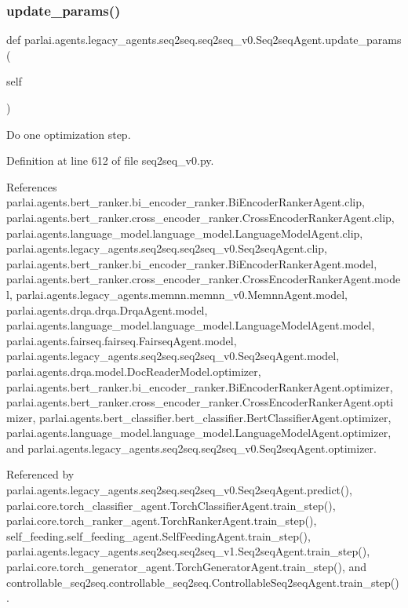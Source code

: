 \subsubsection{\texorpdfstring{update\+\_\+params()}{update\_params()}}
{\footnotesize\ttfamily def parlai.\+agents.\+legacy\+\_\+agents.\+seq2seq.\+seq2seq\+\_\+v0.\+Seq2seq\+Agent.\+update\+\_\+params (\begin{DoxyParamCaption}\item[{}]{self }\end{DoxyParamCaption})}

\begin{DoxyVerb}Do one optimization step.\end{DoxyVerb}
 

Definition at line 612 of file seq2seq\+\_\+v0.\+py.



References parlai.\+agents.\+bert\+\_\+ranker.\+bi\+\_\+encoder\+\_\+ranker.\+Bi\+Encoder\+Ranker\+Agent.\+clip, parlai.\+agents.\+bert\+\_\+ranker.\+cross\+\_\+encoder\+\_\+ranker.\+Cross\+Encoder\+Ranker\+Agent.\+clip, parlai.\+agents.\+language\+\_\+model.\+language\+\_\+model.\+Language\+Model\+Agent.\+clip, parlai.\+agents.\+legacy\+\_\+agents.\+seq2seq.\+seq2seq\+\_\+v0.\+Seq2seq\+Agent.\+clip, parlai.\+agents.\+bert\+\_\+ranker.\+bi\+\_\+encoder\+\_\+ranker.\+Bi\+Encoder\+Ranker\+Agent.\+model, parlai.\+agents.\+bert\+\_\+ranker.\+cross\+\_\+encoder\+\_\+ranker.\+Cross\+Encoder\+Ranker\+Agent.\+model, parlai.\+agents.\+legacy\+\_\+agents.\+memnn.\+memnn\+\_\+v0.\+Memnn\+Agent.\+model, parlai.\+agents.\+drqa.\+drqa.\+Drqa\+Agent.\+model, parlai.\+agents.\+language\+\_\+model.\+language\+\_\+model.\+Language\+Model\+Agent.\+model, parlai.\+agents.\+fairseq.\+fairseq.\+Fairseq\+Agent.\+model, parlai.\+agents.\+legacy\+\_\+agents.\+seq2seq.\+seq2seq\+\_\+v0.\+Seq2seq\+Agent.\+model, parlai.\+agents.\+drqa.\+model.\+Doc\+Reader\+Model.\+optimizer, parlai.\+agents.\+bert\+\_\+ranker.\+bi\+\_\+encoder\+\_\+ranker.\+Bi\+Encoder\+Ranker\+Agent.\+optimizer, parlai.\+agents.\+bert\+\_\+ranker.\+cross\+\_\+encoder\+\_\+ranker.\+Cross\+Encoder\+Ranker\+Agent.\+optimizer, parlai.\+agents.\+bert\+\_\+classifier.\+bert\+\_\+classifier.\+Bert\+Classifier\+Agent.\+optimizer, parlai.\+agents.\+language\+\_\+model.\+language\+\_\+model.\+Language\+Model\+Agent.\+optimizer, and parlai.\+agents.\+legacy\+\_\+agents.\+seq2seq.\+seq2seq\+\_\+v0.\+Seq2seq\+Agent.\+optimizer.



Referenced by parlai.\+agents.\+legacy\+\_\+agents.\+seq2seq.\+seq2seq\+\_\+v0.\+Seq2seq\+Agent.\+predict(), parlai.\+core.\+torch\+\_\+classifier\+\_\+agent.\+Torch\+Classifier\+Agent.\+train\+\_\+step(), parlai.\+core.\+torch\+\_\+ranker\+\_\+agent.\+Torch\+Ranker\+Agent.\+train\+\_\+step(), self\+\_\+feeding.\+self\+\_\+feeding\+\_\+agent.\+Self\+Feeding\+Agent.\+train\+\_\+step(), parlai.\+agents.\+legacy\+\_\+agents.\+seq2seq.\+seq2seq\+\_\+v1.\+Seq2seq\+Agent.\+train\+\_\+step(), parlai.\+core.\+torch\+\_\+generator\+\_\+agent.\+Torch\+Generator\+Agent.\+train\+\_\+step(), and controllable\+\_\+seq2seq.\+controllable\+\_\+seq2seq.\+Controllable\+Seq2seq\+Agent.\+train\+\_\+step().

